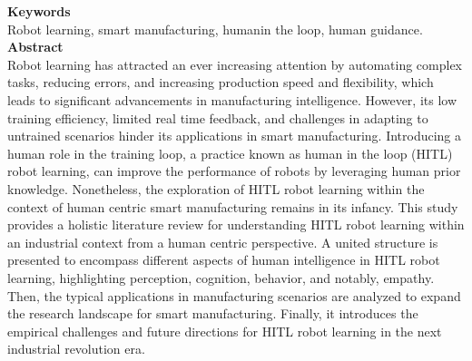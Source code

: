 \documentclass[report.tex]{subfiles}
\begin{document}
\noindent\textbf{Keywords} \\
Robot learning, smart manufacturing, humanin the loop, human guidance.
   \\

\noindent\textbf{Abstract} \\
Robot learning has attracted an ever increasing attention by automating complex tasks, reducing errors, and increasing production speed and flexibility, which leads to significant advancements in manufacturing intelligence. However, its low training efficiency, limited real time feedback, and challenges in adapting to untrained scenarios hinder its applications in smart manufacturing. Introducing a human role in the training loop, a practice known as human in the loop (HITL) robot learning, can improve the performance of robots by leveraging human prior knowledge. Nonetheless, the exploration of HITL robot learning within the context of human centric smart manufacturing remains in its infancy. This study provides a holistic literature review for understanding HITL robot learning within an industrial context from a human centric perspective. A united structure is presented to encompass different aspects of human intelligence in HITL robot learning, highlighting perception, cognition, behavior, and notably, empathy. Then, the typical applications in manufacturing scenarios are analyzed to expand the research landscape for smart manufacturing. Finally, it introduces the empirical challenges and future directions for HITL robot learning in the next industrial revolution era.\\
\end{document}

